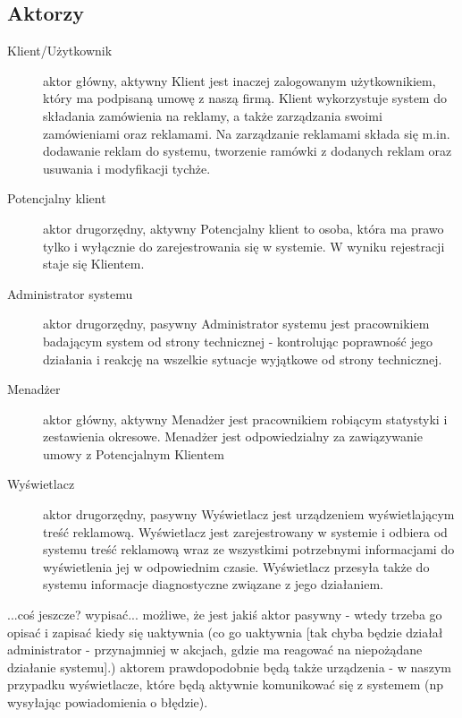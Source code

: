 \documentclass[10pt,a4paper,titlepage]{article} %
\begin{document}
		\subsection{Aktorzy}
		\begin{description}
			\item[Klient/Użytkownik] aktor główny, aktywny \newline Klient jest inaczej
				  zalogowanym użytkownikiem, który ma podpisaną umowę z naszą firmą. Klient wykorzystuje
				system do składania zamówienia na reklamy, a także zarządzania swoimi
				zamówieniami oraz reklamami. Na zarządzanie reklamami składa się m.in.
				dodawanie reklam do systemu, tworzenie ramówki z dodanych reklam oraz
				usuwania i modyfikacji tychże.
			\item[Potencjalny klient] aktor drugorzędny, aktywny \newline
				Potencjalny klient to osoba, która ma prawo tylko i wyłącznie do zarejestrowania się w
				systemie.
			W wyniku rejestracji staje się Klientem.
			\item[Administrator systemu] aktor drugorzędny, pasywny \newline
				Administrator systemu jest pracownikiem badającym system od strony technicznej
				- kontrolując poprawność jego działania i reakcję na wszelkie
				sytuacje wyjątkowe od strony technicznej.
			\item[Menadżer]  aktor główny, aktywny \newline 
				Menadżer jest pracownikiem robiącym statystyki i
				zestawienia okresowe. Menadżer jest odpowiedzialny za zawiązywanie
				umowy z Potencjalnym Klientem
			\item[Wyświetlacz]  aktor drugorzędny, pasywny \newline 
				Wyświetlacz jest urządzeniem wyświetlającym treść reklamową. Wyświetlacz jest
				zarejestrowany w systemie i odbiera od systemu treść reklamową wraz ze
				wszystkimi potrzebnymi informacjami do wyświetlenia jej w odpowiednim czasie.
				Wyświetlacz przesyła także do systemu informacje diagnostyczne związane z jego
				działaniem.
		\end{description}
		
		...coś jeszcze? wypisać...\newline
		możliwe, że jest jakiś aktor pasywny - wtedy trzeba go opisać i zapisać kiedy się uaktywnia (co go uaktywnia [tak chyba będzie działał administrator - przynajmniej w akcjach, gdzie ma reagować na niepożądane działanie systemu].)
		\newline aktorem prawdopodobnie będą także urządzenia - w naszym przypadku wyświetlacze, które będą aktywnie komunikować się z systemem (np wysyłając powiadomienia o błędzie).\newline
		
\end{document}
